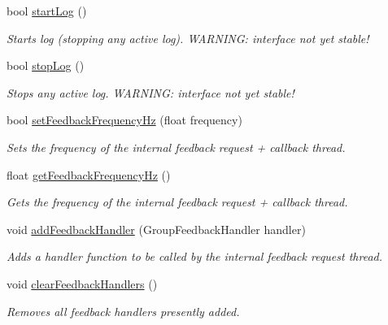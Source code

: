 \begin{DoxyCompactItemize}
bool \hyperlink{classhebi_1_1Group_ac3760e72c22a47f365e8c23d9a6dcfb7}{start\+Log} ()
\begin{DoxyCompactList}\small\item\em Starts log (stopping any active log). W\+A\+R\+N\+I\+NG\+: interface not yet stable! \end{DoxyCompactList}\item 
bool \hyperlink{classhebi_1_1Group_adbbbbe95f600cb2843c1b51281a74744}{stop\+Log} ()
\begin{DoxyCompactList}\small\item\em Stops any active log. W\+A\+R\+N\+I\+NG\+: interface not yet stable! \end{DoxyCompactList}\item 
bool \hyperlink{classhebi_1_1Group_a4c2dce41b42dc0d318e220098c4d05e4}{set\+Feedback\+Frequency\+Hz} (float frequency)
\begin{DoxyCompactList}\small\item\em Sets the frequency of the internal feedback request + callback thread. \end{DoxyCompactList}\item 
float \hyperlink{classhebi_1_1Group_a5f8e63952136f4d0fc3b847c838985b9}{get\+Feedback\+Frequency\+Hz} ()
\begin{DoxyCompactList}\small\item\em Gets the frequency of the internal feedback request + callback thread. \end{DoxyCompactList}\item 
void \hyperlink{classhebi_1_1Group_a9b428b5d5cf774f0dddc3b50b5daf90e}{add\+Feedback\+Handler} (Group\+Feedback\+Handler handler)\hypertarget{classhebi_1_1Group_a9b428b5d5cf774f0dddc3b50b5daf90e}{}\label{classhebi_1_1Group_a9b428b5d5cf774f0dddc3b50b5daf90e}

\begin{DoxyCompactList}\small\item\em Adds a handler function to be called by the internal feedback request thread. \end{DoxyCompactList}\item 
void \hyperlink{classhebi_1_1Group_a54c23fbada200539f7f0d84d97b40f9b}{clear\+Feedback\+Handlers} ()\hypertarget{classhebi_1_1Group_a54c23fbada200539f7f0d84d97b40f9b}{}\label{classhebi_1_1Group_a54c23fbada200539f7f0d84d97b40f9b}

\begin{DoxyCompactList}\small\item\em Removes all feedback handlers presently added. \end{DoxyCompactList}\end{DoxyCompactItemize}
